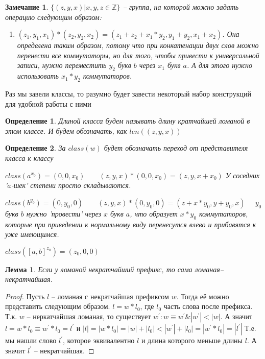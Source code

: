 \documentclass[12pt,a4paper, flushleft]{article}
\newtheorem{Def}{Определение}[section]
\newtheorem{Lm}{Лемма}[section]
\newtheorem{Zm}{Замечание}[section]
\newcommand{\p}[1]{#1^{\prime}}
\begin{document}
\begin{Zm}
	$\{(z, y, x)| x, y, z \in \mathds{Z}\}$ -- группа, на которой можно задать операцию следующим образом:
	\begin{enumerate}
		\item[] $(z_1, y_1, x_1) * (z_2, y_2, x_2) = (z_1 + z_2 + x_1*y_2, y_1 + y_2, x_1 + x_2)$. Она определена таким образом, потому что при конкатенации двух слов можно перенести все коммутаторы, но для того, чтобы привести к универсальной записи, нужно переместить $y_2$ букв $b$ через $x_1$ букв $a$. А для этого нужно использовать $x_1*y_2$ коммутаторов.
	\end{enumerate}
\end{Zm}

Раз мы завели классы, то разумно будет завести некоторый набор конструкций для удобной работы с ними

\begin{Def}
	Длиной класса будем называть длину кратчайшей ломаной в этом классе. И будем обозначать, как $len((z, y, x))$
\end{Def}

\begin{Def}
	За $class(w)$ будет обозначать переход от представителя класса к классу
	
	$class(a^{x_0}) = (0, 0, x_0)\qquad (z, y, x) * (0, 0, x_0) = (z, y, x+x_0)$ У соседних '$a$-шек' степени просто складываются.
	
	$class(b^{y_0}) = (0, y_0, 0)\qquad (z, y, x) * (0, y_0, 0) = (z + x*y_0, y+y_0, x)$ $\quad y_0$ букв $b$ нужно 'провести' через $x$ букв $a$, что образует $x*y_0$ коммутаторов, которые при приведении к нормальному виду перенесутся влево и прибавятся к уже имеющимся.
	
	$class([a, b]^{z_0}) = (z_0, 0, 0)$
\end{Def}

\begin{Lm}
	Если у ломаной некратчайший префикс, то сама ломаная-- некратчайшая.
\end{Lm}
\begin{proof}
	Пусть $l$ -- ломаная с некратчайшая префиксом $w$. Тогда её можно представить следующим образом. $l = w * l_0$, где $l_0$ часть слова после префикса. Т.к. $w$ -- неркатчайшая ломаная, то существует $\p w: w\equiv \p w\& |\p w|<|w|$. А значит $l = w*l_0\equiv \p w*l_0 = \p l$ и $|l| = |w*l_0| = |w| + |l_0| < |\p w| + |l_0| = |\p w*l_0| = |\p l|$ Т.е. мы нашли слово $\p l$, которое эквивалентно $l$ и длина которого меньше длины $l$. А значит $\p l$ -- некратчайшая.
\end{proof}
\end{document}
